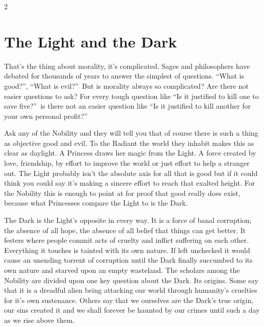 \label{cha:NoblesseOblige}

\begin{multicols}{2}

\section*{The Light and the Dark}%
\label{sec:LightAndTheDark}

That's the thing about morality, it's complicated. Sages and philosophers have debated for thousands of years to answer the simplest of questions. \textquotedblleft What is good?\textquotedblright, \textquotedblleft What is evil?\textquotedblright\, But is morality always so complicated? Are there not easier questions to ask? For every tough question like \textquotedblleft Is it justified to kill one to save five?\textquotedblright\, is there not an easier question like \textquotedblleft Is it justified to kill another for your own personal profit?\textquotedblright

Ask any of the Nobility and they will tell you that of course there is such a thing as objective good and evil. To the Radiant the world they inhabit makes this as clear as daylight. A Princess draws her magic from the Light. A force created by love, friendship, by effort to improve the world or just effort to help a stranger out. The Light probably isn't the absolute axis for all that is good but if it could think you could say it's making a sincere effort to reach that exalted height. For the Nobility this is enough to point at for proof that good really does exist, because what Princesses compare the Light to is the Dark.

The Dark is the Light's opposite in every way. It is a force of banal corruption; the absence of all hope, the absence of all belief that things can get better. It festers where people commit acts of cruelty and inflict suffering on each other. Everything it touches is tainted with its own nature. If left unchecked it would cause an unending torrent of corruption until the Dark finally succumbed to its own nature and starved upon an empty wasteland. The scholars among the Nobility are divided upon one key question about the Dark. Its origins. Some say that it is a dreadful alien being attacking our world through humanity's cruelties for it's own sustenance. Others say that we ourselves are the Dark's true origin, our sins created it and we shall forever be haunted by our crimes until such a day as we rise above them. 


\end{multicols}
